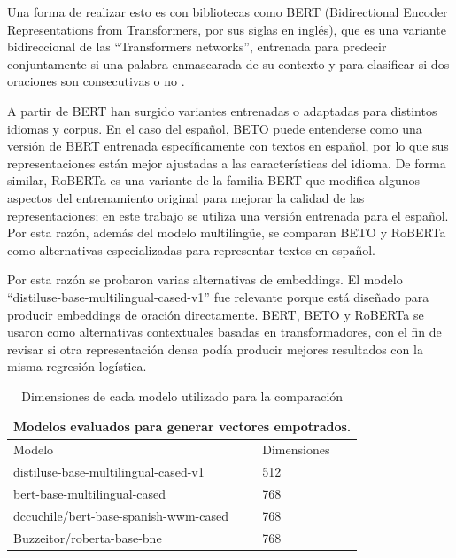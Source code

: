 \documentclass[12pt]{article}
\begin{document}
Una forma de realizar esto es con bibliotecas como BERT (Bidirectional Encoder Representations
from Transformers, por sus siglas en inglés), que es una variante bidireccional de las ``Transformers networks'', entrenada para predecir conjuntamente si una palabra enmascarada de su contexto y para clasificar si dos oraciones son consecutivas o no \cite{jawahar2019bert}.

A partir de BERT han surgido variantes entrenadas o adaptadas para distintos idiomas y corpus. En el caso del español, BETO puede entenderse como una versión de BERT entrenada específicamente con textos en español, por lo que sus representaciones están mejor ajustadas a las características del idioma. De forma similar, RoBERTa es una variante de la familia BERT que modifica algunos aspectos del entrenamiento original para mejorar la calidad de las representaciones; en este trabajo se utiliza una versión entrenada para el español. Por esta razón, además del modelo multilingüe, se comparan BETO y RoBERTa como alternativas especializadas para representar textos en español.

Por esta razón se probaron varias alternativas de embeddings. El modelo ``distiluse-base-multilingual-cased-v1'' fue relevante porque está diseñado para producir embeddings de oración directamente. BERT, BETO y RoBERTa se usaron como alternativas contextuales basadas en transformadores, con el fin de revisar si otra representación densa podía producir mejores resultados con la misma regresión logística.

\begin{table}[H]
\centering
\begin{tabular}{p{}p{}p{}}
\multicolumn{3}{c}{Modelos evaluados para generar vectores empotrados.} \\
\toprule
Modelo & Dimensiones \\
\midrule
  distiluse-base-multilingual-cased-v1 & 512 \\
  bert-base-multilingual-cased & 768 \\
  dccuchile/bert-base-spanish-wwm-cased & 768 \\
  Buzzeitor/roberta-base-bne & 768 \\
\bottomrule
\end{tabular}
\caption{Dimensiones de cada modelo utilizado para la comparación}
\label{tab:Bert-models}
\end{table}
\end{document}
